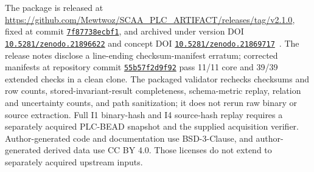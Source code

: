 \documentclass[a4paper,fleqn]{cas-dc}
\begin{document}
The package is released at \url{https://github.com/Mewtwoz/SCAA_PLC_ARTIFACT/releases/tag/v2.1.0}, fixed at commit \href{https://github.com/Mewtwoz/SCAA_PLC_ARTIFACT/commit/7f87738ecbf19c09d5d63bee99e6de86ac32bce1}{\texttt{7f87738ecbf1}}, and archived under version DOI \href{https://doi.org/10.5281/zenodo.21896622}{\texttt{10.5281/zenodo.21896622}} and concept DOI \href{https://doi.org/10.5281/zenodo.21869717}{\texttt{10.5281/zenodo.21869717}}~\citep{scaa_plc_artifact_v2}. The release notes disclose a line-ending checksum-manifest erratum; corrected manifests at repository commit \href{https://github.com/Mewtwoz/SCAA_PLC_ARTIFACT/commit/55b57f2d9f92d928daacb15e66c192c23f1e7775}{\texttt{55b57f2d9f92}} pass 11/11 core and 39/39 extended checks in a clean clone. The packaged validator rechecks checksums and row counts, stored-invariant-result completeness, schema-metric replay, relation and uncertainty counts, and path sanitization; it does not rerun raw binary or source extraction. Full I1 binary-hash and I4 source-hash replay requires a separately acquired PLC-BEAD snapshot and the supplied acquisition verifier. Author-generated code and documentation use BSD-3-Clause, and author-generated derived data use CC BY 4.0. Those licenses do not extend to separately acquired upstream inputs.



\end{document}
